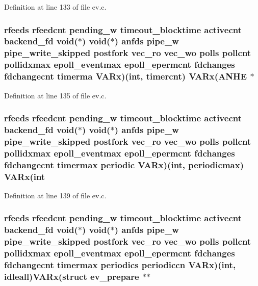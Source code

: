 \-Definition at line 133 of file ev.\-c.

\hypertarget{structev__loop_a126cf8d9f6e5fefd6da920905aee2244}{
\subsubsection[{\-V\-A\-Rx}]{ {\bf rfeeds} {\bf rfeedcnt} {\bf pending\-\_\-w} {\bf timeout\-\_\-blocktime} {\bf activecnt} {\bf backend\-\_\-fd} void($\ast$) void($\ast$) {\bf anfds} {\bf pipe\-\_\-w} {\bf pipe\-\_\-write\-\_\-skipped} {\bf postfork} {\bf vec\-\_\-ro} {\bf vec\-\_\-wo} {\bf polls} {\bf pollcnt} {\bf pollidxmax} {\bf epoll\-\_\-eventmax} {\bf epoll\-\_\-epermcnt} {\bf fdchanges} {\bf fdchangecnt} timerma {\bf \-V\-A\-Rx})(int, {\bf timercnt}) {\bf \-V\-A\-Rx}({\bf \-A\-N\-H\-E} $\ast$}}\label{structev__loop_a126cf8d9f6e5fefd6da920905aee2244}


\-Definition at line 135 of file ev.\-c.

\hypertarget{structev__loop_ad388d5465b1ea47bb2c50cc324b219e4}{
\subsubsection[{\-V\-A\-Rx}]{ {\bf rfeeds} {\bf rfeedcnt} {\bf pending\-\_\-w} {\bf timeout\-\_\-blocktime} {\bf activecnt} {\bf backend\-\_\-fd} void($\ast$) void($\ast$) {\bf anfds} {\bf pipe\-\_\-w} {\bf pipe\-\_\-write\-\_\-skipped} {\bf postfork} {\bf vec\-\_\-ro} {\bf vec\-\_\-wo} {\bf polls} {\bf pollcnt} {\bf pollidxmax} {\bf epoll\-\_\-eventmax} {\bf epoll\-\_\-epermcnt} {\bf fdchanges} {\bf fdchangecnt} {\bf timermax} periodic {\bf \-V\-A\-Rx})(int, {\bf periodicmax}) {\bf \-V\-A\-Rx}(int}}\label{structev__loop_ad388d5465b1ea47bb2c50cc324b219e4}


\-Definition at line 139 of file ev.\-c.

\hypertarget{structev__loop_aecd3c7cef8d195c6905f198555ea82cf}{
\subsubsection[{\-V\-A\-Rx}]{ {\bf rfeeds} {\bf rfeedcnt} {\bf pending\-\_\-w} {\bf timeout\-\_\-blocktime} {\bf activecnt} {\bf backend\-\_\-fd} void($\ast$) void($\ast$) {\bf anfds} {\bf pipe\-\_\-w} {\bf pipe\-\_\-write\-\_\-skipped} {\bf postfork} {\bf vec\-\_\-ro} {\bf vec\-\_\-wo} {\bf polls} {\bf pollcnt} {\bf pollidxmax} {\bf epoll\-\_\-eventmax} {\bf epoll\-\_\-epermcnt} {\bf fdchanges} {\bf fdchangecnt} {\bf timermax} {\bf periodics} periodiccn {\bf \-V\-A\-Rx})(int, {\bf idleall}){\bf \-V\-A\-Rx}(struct {\bf ev\-\_\-prepare} $\ast$$\ast$}}\label{structev__loop_aecd3c7cef8d195c6905f198555ea82cf}



